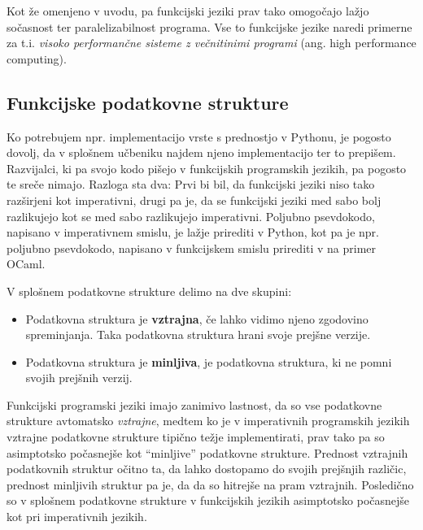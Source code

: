 \documentclass[mat1, tisk]{fmfdelo}
\begin{document}
Kot že omenjeno v uvodu, pa funkcijski jeziki prav tako omogočajo lažjo sočasnost ter paralelizabilnost programa. 
Vse to funkcijske jezike naredi primerne za t.i. \textit{visoko performančne sisteme z večnitinimi programi} (ang. high performance computing).


\subsection{Funkcijske podatkovne strukture}

Ko potrebujem npr. implementacijo vrste s prednostjo v Pythonu, je pogosto dovolj, da v splošnem učbeniku najdem njeno implementacijo ter to prepišem. 
Razvijalci, ki pa svojo kodo pišejo v funkcijskih programskih jezikih, pa pogosto te sreče nimajo. 
Razloga sta dva: Prvi bi bil, da funkcijski jeziki niso tako razširjeni kot imperativni, drugi pa je, da se funkcijski jeziki med sabo bolj razlikujejo kot se med sabo razlikujejo imperativni. 
Poljubno psevdokodo, napisano v imperativnem smislu, je lažje prirediti v Python, kot pa je npr. poljubno psevdokodo, napisano v funkcijskem smislu prirediti v na primer OCaml.

\begin{definicija}
V splošnem podatkovne strukture delimo na dve skupini:
\begin{itemize}
  \item Podatkovna struktura je \textbf{vztrajna}, če lahko vidimo njeno zgodovino spreminjanja. Taka podatkovna struktura hrani svoje prejšne verzije.
  \item Podatkovna struktura je \textbf{minljiva}, je podatkovna struktura, ki ne pomni svojih prejšnih verzij.
\end{itemize}
\end{definicija}

Funkcijski programski jeziki imajo zanimivo lastnost, da so vse podatkovne strukture avtomatsko \textit{vztrajne}, 
medtem ko je v imperativnih programskih jezikih vztrajne podatkovne strukture tipično težje implementirati, prav tako pa so asimptotsko počasnejše kot ``minljive'' podatkovne strukture. 
Prednost vztrajnih podatkovnih struktur očitno ta, da lahko dostopamo do svojih prejšnjih različic, prednost minljivih struktur pa je, da da so hitrejše na pram vztrajnih. 
Posledično so v splošnem podatkovne strukture v funkcijskih jezikih asimptotsko počasnejše kot pri imperativnih jezikih.
\end{document}

